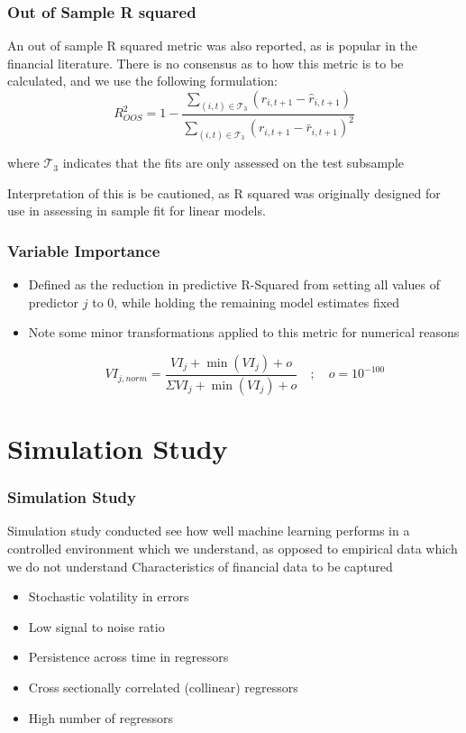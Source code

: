 \documentclass[aspectratio=169]{beamer}
\begin{document}
\begin{frame}
\frametitle{Out of Sample R squared}
		
An out of sample R squared metric was also reported, as is popular in the financial literature. There is no consensus as to how this metric is to be calculated, and we use the following formulation:
\begin{equation}
R^2_{OOS} = 
	1 - 
	\frac{\sum_{(i, t)\in\mathcal{T}_3}(r_{i, t+1} - \widehat{r}_{i, t+1})}
	{\sum_{(i, t)\in\mathcal{T}_3} \left( r_{i, t+1} - \bar{r}_{i, t+1} \right) ^2}
\end{equation}
		
where $\mathcal{T}_3$ indicates that the fits are only assessed on the test subsample
		
Interpretation of this is be cautioned, as R squared was originally designed for use in assessing in sample fit for linear models.
\end{frame}
	
\begin{frame}
\frametitle{Variable Importance}	
\begin{itemize}
	\item Defined as the reduction in predictive R-Squared from setting all values of predictor $j$ to 0, while holding the remaining model estimates fixed
	\item Note some minor transformations applied to this metric for numerical reasons
			
	\begin{equation}
	VI_{j, norm} = \frac{VI_j + \operatorname{min}(VI_j) + o}
	{\Sigma VI_j + \operatorname{min}(VI_j) + o} \quad ; \quad o = 10^{-100}
		\end{equation}
	\end{itemize}
\end{frame}

\section{Simulation Study}

\begin{frame}
\frametitle{Simulation Study}
Simulation study conducted see how well machine learning performs in a controlled environment which we understand, as opposed to empirical data which we do not understand
Characteristics of financial data to be captured
\begin{itemize}
	\item Stochastic volatility in errors
	\item Low signal to noise ratio
	\item Persistence across time in regressors
	\item Cross sectionally correlated (collinear) regressors
	\item High number of regressors
\end{itemize}
\end{frame}
\end{document}
